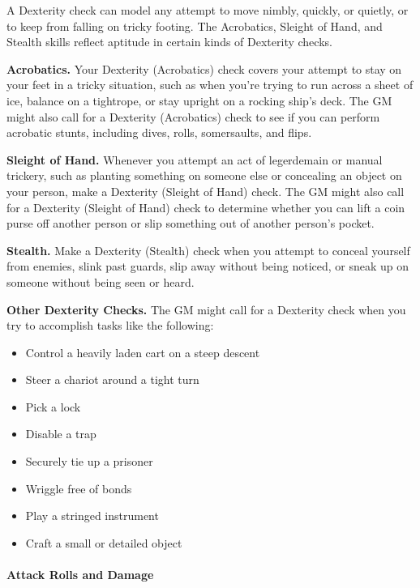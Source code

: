 \documentclass[
]{article}
\providecommand{\tightlist}{%
  \setlength{\itemsep}{0pt}\setlength{\parskip}{0pt}}
\begin{document}
A Dexterity check can model any attempt to move nimbly, quickly, or
quietly, or to keep from falling on tricky footing. The Acrobatics,
Sleight of Hand, and Stealth skills reflect aptitude in certain kinds of
Dexterity checks.

\textbf{Acrobatics.} Your Dexterity (Acrobatics) check covers your
attempt to stay on your feet in a tricky situation, such as when you're
trying to run across a sheet of ice, balance on a tightrope, or stay
upright on a rocking ship's deck. The GM might also call for a Dexterity
(Acrobatics) check to see if you can perform acrobatic stunts, including
dives, rolls, somersaults, and flips.

\textbf{Sleight of Hand.} Whenever you attempt an act of legerdemain or
manual trickery, such as planting something on someone else or
concealing an object on your person, make a Dexterity (Sleight of Hand)
check. The GM might also call for a Dexterity (Sleight of Hand) check to
determine whether you can lift a coin purse off another person or slip
something out of another person's pocket.

\textbf{Stealth.} Make a Dexterity (Stealth) check when you attempt to
conceal yourself from enemies, slink past guards, slip away without
being noticed, or sneak up on someone without being seen or heard.

\textbf{Other Dexterity Checks.} The GM might call for a Dexterity check
when you try to accomplish tasks like the following:

\begin{itemize}
\tightlist
\item
  Control a heavily laden cart on a steep descent
\item
  Steer a chariot around a tight turn
\item
  Pick a lock
\item
  Disable a trap
\item
  Securely tie up a prisoner
\item
  Wriggle free of bonds
\item
  Play a stringed instrument
\item
  Craft a small or detailed object
\end{itemize}

\hypertarget{attack-rolls-and-damage-1}{%
\paragraph{Attack Rolls and Damage}\label{attack-rolls-and-damage-1}}
\end{document}

